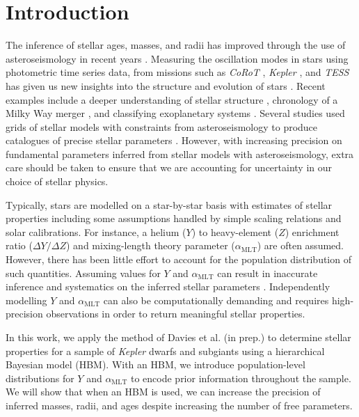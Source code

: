 \documentclass[fleqn,usenatbib]{mnras}
\newcommand{\mlt}{\ensuremath{{\alpha_\mathrm{MLT}}}}
\begin{document}
\section{Introduction}



The inference of stellar ages, masses, and radii has improved through the use of asteroseismology in recent years \citep[e.g. see the review by][]{Chaplin.Miglio2013}. Measuring the oscillation modes in stars using photometric time series data, from missions such as \emph{CoRoT} \citep{Baglin.Auvergne.ea2006}, \emph{Kepler} \citep{Borucki.Koch.ea2010}, and \emph{TESS} \citep{Ricker.Winn.ea2015} has given us new insights into the structure and evolution of stars \citep{Garcia.Ballot2019}. Recent examples include a deeper understanding of stellar structure \citep{Verma.Raodeo.ea2017}, chronology of a Milky Way merger \citep{Chaplin.Serenelli.ea2020}, and classifying exoplanetary systems \citep{Huber.Chaplin.ea2019, Tayar.Claytor.ea2020}. Several studies used grids of stellar models with constraints from asteroseismology to produce catalogues of precise stellar parameters \citep{Pinsonneault.Elsworth.ea2014, SilvaAguirre.Lund.ea2017}. However, with increasing precision on fundamental parameters inferred from stellar models with asteroseismology, extra care should be taken to ensure that we are accounting for uncertainty in our choice of stellar physics.

Typically, stars are modelled on a star-by-star basis with estimates of stellar properties including some assumptions handled by simple scaling relations and solar calibrations. For instance, a helium ($Y$) to heavy-element ($Z$) enrichment ratio ($\Delta Y / \Delta Z$) and mixing-length theory parameter ($\mlt$) are often assumed. However, there has been little effort to account for the population distribution of such quantities. Assuming values for $Y$ and $\mlt$ can result in inaccurate inference and systematics on the inferred stellar parameters \citep{Valle.DellOmodarme.ea2015}. Independently modelling $Y$ and $\mlt$ can also be computationally demanding and requires high-precision observations in order to return meaningful stellar properties.

In this work, we apply the method of Davies et al. (in prep.) to determine stellar properties for a sample of \emph{Kepler} dwarfs and subgiants using a hierarchical Bayesian model (HBM). With an HBM, we introduce population-level distributions for $Y$ and $\mlt$ to encode prior information throughout the sample. We will show that when an HBM is used, we can increase the precision of inferred masses, radii, and ages despite increasing the number of free parameters.
\end{document}
